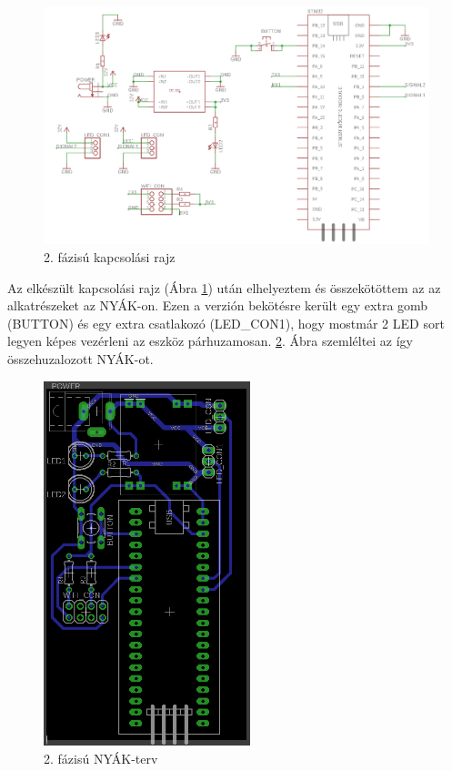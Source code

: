 \documentclass[../main.tex]{subfiles}
\begin{document}
        \begin{figure}[h!]
            \centering
                \includegraphics[width=15cm]{resources/pcb_res/schematic_v01.png}
            \caption{2. fázisú kapcsolási rajz}
            \label{fig:schematic_v01}
        \end{figure}
        
        Az elkészült kapcsolási rajz (Ábra \ref{fig:schematic_v01}) után elhelyeztem és összekötöttem az az alkatrészeket az NYÁK-on. Ezen a verzión bekötésre került egy extra gomb (BUTTON) és egy extra csatlakozó (LED\_CON1), hogy mostmár 2 LED sort legyen képes vezérleni az eszköz párhuzamosan. \ref{fig:board_v01}. Ábra szemléltei az így összehuzalozott NYÁK-ot.
        
        \begin{figure}[h!]
            \centering
                \includegraphics[width=6cm, angle =-90]{resources/pcb_res/board_v01.png}
            \caption{2. fázisú NYÁK-terv}
            \label{fig:board_v01}
        \end{figure}
        
\end{document}
